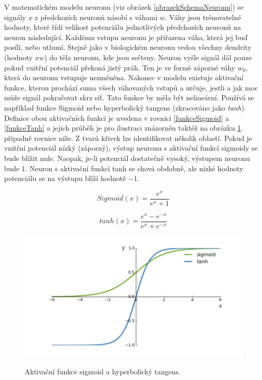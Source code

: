 V matematickém modelu neuronu (viz obrázek \ref{obrazekSchemaNeuronu}) 
se signály $ x $ z předchozích neuronů
násobí s váhami $ w $.
Váhy jsou trénovatelné hodnoty, 
které řídí velikost potenciálu
jednotlivých předchozích neuronů na neuron následující. 
Každému vstupu neuronu je přiřazena váha, 
která jej buď posílí, nebo utlumí.
Stejně jako v biologickém neuronu vedou všechny dendrity (hodnoty $ xw $)
do těla neuronu, kde jsou sečteny.
Neuron vyšle signál dál pouze pokud vnitřní potenciál překoná jistý práh.
Ten je ve formě záporné váhy $ w_0 $, 
která do neuronu vstupuje nezměněna.
Nakonec v modelu existuje aktivační funkce,
kterou prochází suma všech váhovaných vstupů a
určuje, jestli a jak moc může signál pokračovat skrz síť.
Tato funkce by měla být nelineární.
Používá se například funkce Sigmoid nebo hyperbolický tangens 
(zkracováno jako \emph{tanh}).
Definice obou aktivačních funkcí je uvedena v rovnici
\ref{funkceSigmoid} a \ref{funkceTanh} 
a jejich průběh je pro ilustraci znázorněn taktéž na obrázku 
\ref{obrazekAktivačníFunkce}.
případně rovnice níže.
Z tvarů křivek lze identifikovat několik oblastí.
Pokud je vnitřní potenciál nízký (záporný), 
výstup neuronu s aktivační funkcí sigmoidy se bude blížit nule.
Naopak, je-li potenciál dostatečně vysoký, výstupem neuronu bude 1.
Neuron s aktivační funkcí tanh se chová obdobně,
ale nízké hodnoty potenciálu se na výstupu blíží hodnotě $ -1 $.
\cite{Goodfellow-et-al-2016, Nicholson_NeuralNets}

\begin{equation}\label{funkceSigmoid}
     Sigmoid(x) = \frac{e^x}{e^x + 1}
\end{equation}

\begin{equation}\label{funkceTanh}
    tanh(x) = \frac{e^x - e^{-x}}{e^x + e^{-x}}
\end{equation}

\begin{figure}[h]\centering
    \centering
    \includegraphics[width=0.8\linewidth]{obrazky/tanh_v_sigmoid.jpg}\\[1pt]  
    \caption{Aktivační funkce sigmoid a hyperbolický tangens.}    
    \label{obrazekAktivačníFunkce}
\end{figure}

